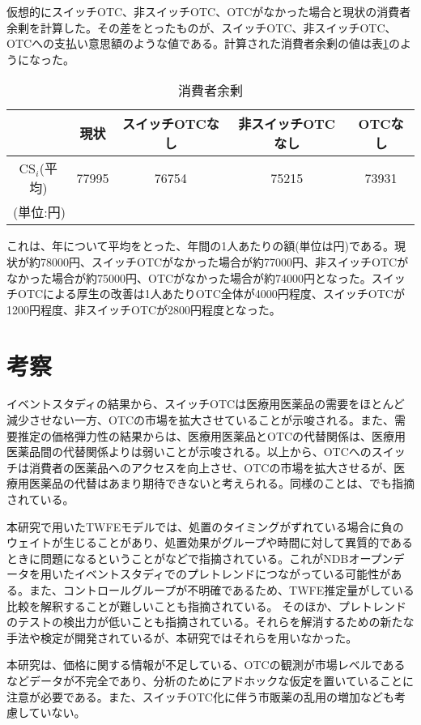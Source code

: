 \documentclass[a4paper,11pt,uplatex]{jsarticle}
\theoremstyle{definition}
\begin{document}
仮想的にスイッチOTC、非スイッチOTC、OTCがなかった場合と現状の消費者余剰を計算した。その差をとったものが、スイッチOTC、非スイッチOTC、OTCへの支払い意思額のような値である。計算された消費者余剰の値は表\ref{consumer_surplus}のようになった。
\begin{table}[H]\centering \caption{消費者余剰}\label{consumer_surplus}
    \begin{tabular}{ccccc}
        \hline
        &現状 & スイッチOTCなし & 非スイッチOTCなし & OTCなし \\
        \hline
        \(\textrm{CS}_i\)(平均)&77995 & 76754 & 75215 & 73931\\
        \hline
        \multicolumn{5}{l}{\small (単位:円)}
    \end{tabular}
\end{table}
これは、年について平均をとった、年間の1人あたりの額(単位は円)である。現状が約78000円、スイッチOTCがなかった場合が約77000円、非スイッチOTCがなかった場合が約75000円、OTCがなかった場合が約74000円となった。スイッチOTCによる厚生の改善は1人あたりOTC全体が4000円程度、スイッチOTCが1200円程度、非スイッチOTCが2800円程度となった。
\section{考察}
イベントスタディの結果から、スイッチOTCは医療用医薬品の需要をほとんど減少させない一方、OTCの市場を拡大させていることが示唆される。また、需要推定の価格弾力性の結果からは、医療用医薬品とOTCの代替関係は、医療用医薬品間の代替関係よりは弱いことが示唆される。以上から、OTCへのスイッチは消費者の医薬品へのアクセスを向上させ、OTCの市場を拡大させるが、医療用医薬品の代替はあまり期待できないと考えられる。同様のことは、\cite{Stomberg2013}でも指摘されている。

本研究で用いたTWFEモデルでは、処置のタイミングがずれている場合に負のウェイトが生じることがあり、処置効果がグループや時間に対して異質的であるときに問題になるということが\cite{ROTH2023}などで指摘されている。これがNDBオープンデータを用いたイベントスタディでのプレトレンドにつながっている可能性がある。また、コントロールグループが不明確であるため、TWFE推定量がしている比較を解釈することが難しいことも指摘されている。
そのほか、プレトレンドのテストの検出力が低いことも指摘されている。それらを解消するための新たな手法や検定が開発されているが、本研究ではそれらを用いなかった。

本研究は、価格に関する情報が不足している、OTCの観測が市場レベルであるなどデータが不完全であり、分析のためにアドホックな仮定を置いていることに注意が必要である。また、スイッチOTC化に伴う市販薬の乱用の増加なども考慮していない。
\end{document}
